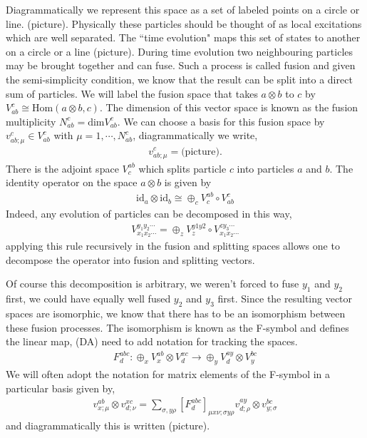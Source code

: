\documentclass[12pt,a4paper]{article}
\newcommand{\tp}{\otimes}
\newcommand{\dave}[1]{{\color{ao(english)}\footnotesize{(DA) #1}}}
\begin{document}
Diagrammatically we represent this space as a set of labeled points on a circle or line. (picture).
Physically these particles should be thought of as local excitations which are well separated.
The ``time evolution" maps this set of states to another on a circle or a line (picture). 
During time evolution two neighbouring particles may be brought together and can fuse.
Such a process is called fusion and given the semi-simplicity condition, we know that the result can be split into a direct sum of particles.
We will label the fusion space that takes $a \otimes b$ to $c$ by $V_{ab}^c \cong \text{Hom}(a\otimes b, c)$. 
The dimension of this vector space is known as the fusion multiplicity $N_{ab}^c = \text{dim} V_{ab}^c$. 
We can choose a basis for this fusion space by $v_{ab; \mu}^c \in V_{ab}^c$ with $\mu = 1, \cdots, N_{ab}^c$, diagrammatically we write,
\begin{align}
v_{ab; \mu}^c = \text{(picture)}.
\end{align}
There is the adjoint space $V_{c}^{ab}$ which splits particle $c$ into particles $a$ and $b$.
The identity operator on the space $a \otimes b$ is given by 
\begin{align}
\text{id}_a \otimes \text{id}_b \cong \oplus_c V^{ab}_c \circ V^c_{ab}
\end{align}
Indeed, any evolution of particles can be decomposed in this way, 
\begin{align}
V_{x_1 x_2 \cdots}^{y_1 y_2 \cdots}  = \oplus_z V^{y1 y2}_z \circ V^{z y_3 \cdots}_{x_1 x_2 \cdots }
\end{align}
applying this rule recursively in the fusion and splitting spaces allows one to decompose the operator into fusion and splitting vectors. 

Of course this decomposition is arbitrary, we weren't forced to fuse $y_1$ and $y_2$ first, we could have equally well fused $y_2$ and $y_3$ first. 
Since the resulting vector spaces are isomorphic, we know that there has to be an isomorphism between these fusion processes. 
The isomorphism is known as the F-symbol and defines the linear map, \dave{need to add notation for tracking the spaces.}
\begin{align}
F^{abc}_d: \oplus_x V^{ab}_x \tp V^{xc}_{d} \rightarrow \oplus_y V^{ay}_d \tp V^{bc}_y
\end{align}
We will often adopt the notation for matrix elements of the F-symbol in a particular basis given by,
\begin{align}
v^{ab}_{x; \mu} \tp v^{x c}_{d; \nu} = \sum_{\sigma, y \rho} \left[ F^{abc}_d \right]_{\mu x \nu ; \sigma y \rho} v^{ay}_{d; \rho} \tp v^{bc}_{y; \sigma}
\end{align}
and diagrammatically this is written (picture).
\end{document}
